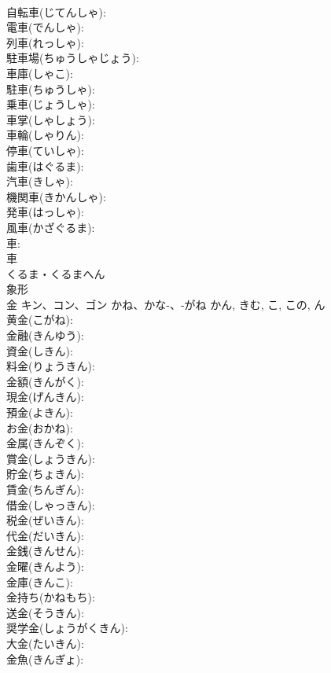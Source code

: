 \documentclass[8pt]{extreport}
\begin{document}
\begin{CJK}{UTF8}{min}
\\	自転車(じてんしゃ): 
\\	電車(でんしゃ): 
\\	列車(れっしゃ): 
\\	駐車場(ちゅうしゃじょう): 
\\	車庫(しゃこ): 
\\	駐車(ちゅうしゃ): 
\\	乗車(じょうしゃ): 
\\	車掌(しゃしょう): 
\\	車輪(しゃりん): 
\\	停車(ていしゃ): 
\\	歯車(はぐるま): 
\\	汽車(きしゃ): 
\\	機関車(きかんしゃ): 
\\	発車(はっしゃ): 
\\	風車(かざぐるま): 
\\	車: 
\\	車	
\\	くるま・くるまへん	
\\	象形 
\\	金	キン、コン、ゴン	かね、かな-、-がね	かん, きむ, こ, この, ん	
\\	黄金(こがね): 
\\	金融(きんゆう): 
\\	資金(しきん): 
\\	料金(りょうきん): 
\\	金額(きんがく): 
\\	現金(げんきん): 
\\	預金(よきん): 
\\	お金(おかね): 
\\	金属(きんぞく): 
\\	賞金(しょうきん): 
\\	貯金(ちょきん): 
\\	賃金(ちんぎん): 
\\	借金(しゃっきん): 
\\	税金(ぜいきん): 
\\	代金(だいきん): 
\\	金銭(きんせん): 
\\	金曜(きんよう): 
\\	金庫(きんこ): 
\\	金持ち(かねもち): 
\\	送金(そうきん): 
\\	奨学金(しょうがくきん): 
\\	大金(たいきん): 
\\	金魚(きんぎょ): 

\end{CJK}
\end{document}
